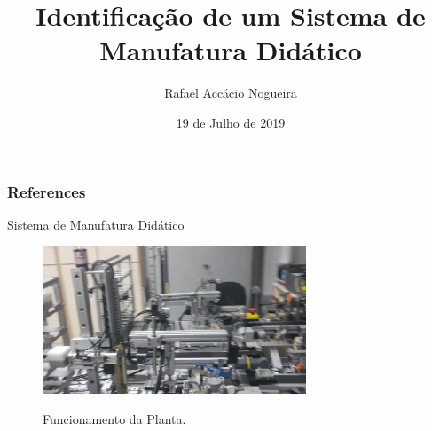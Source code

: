 \documentclass[xcolor=x11names]{beamer}
\author{Rafael Accácio Nogueira}
\title{Identificação de um Sistema de Manufatura Didático}
\institute{Email: raccacio@poli.ufrj.br}
\date{19 de Julho de 2019}
\begin{document}

% 









\appendix
\begin{frame}[allowframebreaks] %

\frametitle{References}

\scriptsize{}

\nocite{moreira2013bridging}

\end{frame}

\begin{frame}{Sistema de Manufatura Didático}
\centering
   \begin{figure}[ht]
\href{run:../../videos/timelapse.avi?start=75&stop=85}{\includegraphics[width=0.7\textwidth]{../../videos/TCCVIDEO_cycle.jpg}}
  \caption{Funcionamento da Planta.}
   \end{figure}
\end{frame}
\end{document}
